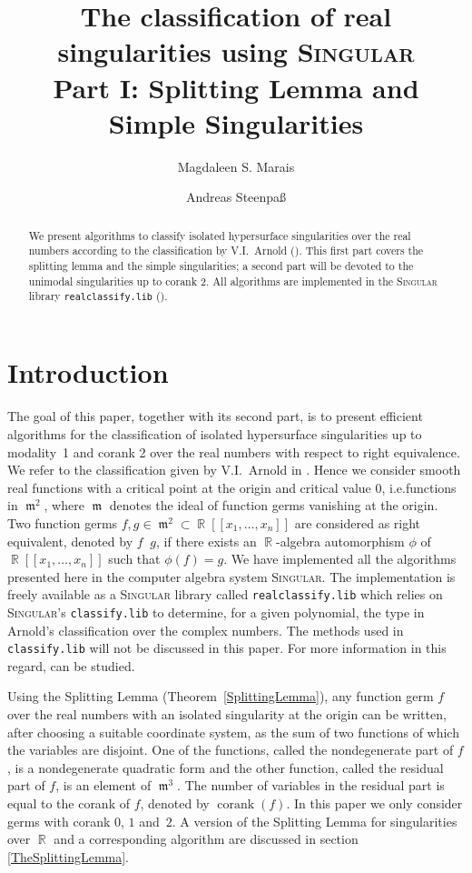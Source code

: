 \documentclass[noend]{amsproc}
\title[The classification of real singularities using \textsc{Singular}, %
Part I]%
{The classification of real singularities using \textsc{Singular}\\
Part I: Splitting Lemma and Simple Singularities}
\author{Magdaleen S. Marais}
\author{Andreas Steenpa\ss}
\newcommand{\Singular}{\textsc{Singular}}
\newcommand{\realclassify}{\texttt{realclassify.lib}}
\newcommand{\classify}{\texttt{classify.lib}}
\DeclareMathOperator{\requiv}{\overset{r}{\sim}}
\DeclareMathOperator{\m}{\mathfrak{m}}
\DeclareMathOperator{\corank}{corank}
\DeclareMathOperator{\R}{\mathbb{R}}
\begin{document}
\begin{abstract}
We present algorithms to classify isolated hypersurface singularities over the
real numbers according to the classification by V.I.~Arnold (\cite{AVG1985}).
This first part covers the splitting lemma and the simple singularities; a
second part will be devoted to the unimodal singularities up to corank 2.
All algorithms are implemented in the \Singular{} library \realclassify{}
(\cite{realclassify}).
\end{abstract}

\maketitle


\section{Introduction}
The goal of this paper, together with its second part, is to present efficient
algorithms for the classification of isolated hypersurface singularities up to
modality~1 and corank 2 over the real numbers with respect to right
equivalence. We refer to the classification given by V.I.~Arnold in
\cite{AVG1985}. Hence we consider smooth real functions with a critical point
at the origin and critical value $0$, i.e.\@ functions in $\m^2$, where $\m$
denotes the ideal of function germs vanishing at the origin. Two function germs
$f, g \in \m^2 \subset \R[[x_1,\ldots,x_n]]$ are considered as right
equivalent, denoted by $f \requiv g$, if there exists an $\R$-algebra
automorphism $\phi$ of $\R[[x_1,\ldots, x_n]]$ such that $\phi(f) = g$.  We
have implemented all the algorithms presented here in the computer algebra
system \Singular.  The implementation is freely available as a \Singular{}
library called \realclassify{} which relies on \Singular's \classify{} to
determine, for a given polynomial, the type in Arnold's classification over the
complex numbers. The methods used in \classify{} will not be discussed in this
paper. For more information in this regard, \cite{Kruger} can be studied.

Using the Splitting Lemma (Theorem~\ref{SplittingLemma}), any function germ $f$
over the real numbers with an isolated singularity at the origin can be
written, after choosing a suitable coordinate system, as the sum of two
functions of which the variables are disjoint. One of the functions, called the
nondegenerate part of $f$, is a nondegenerate quadratic form and the other
function, called the residual part of $f$, is an element of $\m^3$. The number
of variables in the residual part is equal to the corank of $f$, denoted by
$\corank(f)$. In this paper we only consider germs with corank $0$, $1$
and~$2$.  A version of the Splitting Lemma for singularities over $\R$ and a
corresponding algorithm are discussed in section \ref{TheSplittingLemma}.
\end{document}
